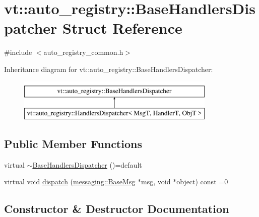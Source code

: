 \hypertarget{structvt_1_1auto__registry_1_1_base_handlers_dispatcher}{}\section{vt\+:\+:auto\+\_\+registry\+:\+:Base\+Handlers\+Dispatcher Struct Reference}
\label{structvt_1_1auto__registry_1_1_base_handlers_dispatcher}


{\ttfamily \#include $<$auto\+\_\+registry\+\_\+common.\+h$>$}

Inheritance diagram for vt\+:\+:auto\+\_\+registry\+:\+:Base\+Handlers\+Dispatcher\+:\begin{figure}[H]
\begin{center}
\leavevmode
\includegraphics[height=2.000000cm]{structvt_1_1auto__registry_1_1_base_handlers_dispatcher}
\end{center}
\end{figure}
\subsection*{Public Member Functions}
\begin{DoxyCompactItemize}
\item 
virtual \hyperlink{structvt_1_1auto__registry_1_1_base_handlers_dispatcher_ae9db8406a630a3ac4094986aa39c747e}{$\sim$\+Base\+Handlers\+Dispatcher} ()=default
\item 
virtual void \hyperlink{structvt_1_1auto__registry_1_1_base_handlers_dispatcher_aefc05db879ce57b3ea0295afa56aa819}{dispatch} (\hyperlink{structvt_1_1messaging_1_1_base_msg}{messaging\+::\+Base\+Msg} $\ast$msg, void $\ast$object) const =0
\end{DoxyCompactItemize}


\subsection{Constructor \& Destructor Documentation}
\mbox{\label{structvt_1_1auto__registry_1_1_base_handlers_dispatcher_ae9db8406a630a3ac4094986aa39c747e}} 
